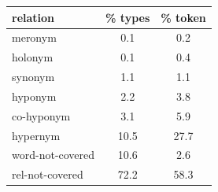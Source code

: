 \begin{table}
\small
\centering
\begin{tabular}{lcc}
\toprule
         relation & \% types & \% token \\
\midrule
 meronym &  0.1 &  0.2 \\
 holonym &  0.1 &  0.4 \\
 synonym &  1.1 &  1.1 \\
 hyponym &  2.2 &  3.8 \\
 co-hyponym &  3.1 &  5.9 \\
 hypernym &  10.5 &  27.7 \\
 word-not-covered &  10.6 &  2.6 \\
 rel-not-covered &  72.2 &  58.3 \\
\bottomrule
\end{tabular}



\end{table}
